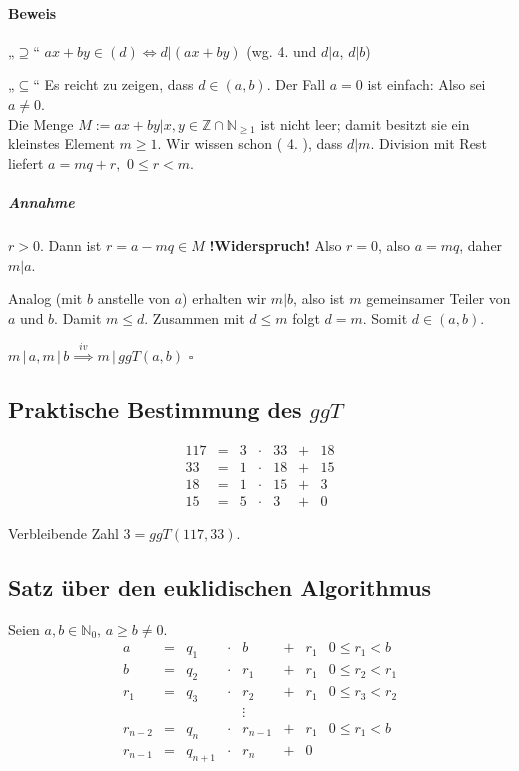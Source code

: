 \documentclass[14pt,a4paper]{article}
\newcommand{\N}{\ensuremath{\mathbb{N}}}
\newcommand{\Z}{\ensuremath{\mathbb{Z}}}
\newcommand{\Nzero}{\ensuremath{\N_0}}
\begin{document}
   		   \paragraph{Beweis}
   			   \par
   			   „$\supseteq$“
   			   $ ax + by \in (d) \Leftrightarrow d|(ax + by) $ (wg. 4. und $d|a$, $d|b$)
   			   \par
   			   „$\subseteq$“
   			   Es reicht zu zeigen, dass $ d \in (a,b) $.
   			   Der Fall $ a=0 $ ist einfach: Also sei $a \neq 0$. \\
   			   Die Menge $ M := {ax + by | x,y \in \Z} \cap \N_{\ge 1} $ ist nicht leer; damit besitzt sie ein kleinstes Element $m \ge 1$.
   			   Wir wissen schon ( 4. ), dass $d|m$.
   			   Division mit Rest liefert $ a = mq + r,\,\, 0 \le r < m $.

   			   \subparagraph{Annahme}
   				   $r > 0$. Dann ist $ r = a - mq \in M$ \textbf{!\;Widerspruch\;!} Also $ r = 0$, also $a = mq$, daher $m|a$.

   				   Analog (mit $b$ anstelle von $a$) erhalten wir $m | b$, also ist $m$ gemeinsamer Teiler von $a$ und $b$.
   				   Damit $m \le d$. Zusammen mit $ d \le m $ folgt $ d = m $.
   				   Somit $ d \in (a,b) $.

   				   $m\,|\,a, m\,|\,b \stackrel{iv}{\implies} m\,|\,ggT(a,b) $
   				   $\square$

   	   \subsection{Praktische Bestimmung des $ggT$}
   		   \[
   			   \begin{matrix}
   				   117 & = & 3 & \cdot & 33 & + & 18 \\
   					33 & = & 1 & \cdot & 18 & + & 15 \\
   					18 & = & 1 & \cdot & 15 & + &  3 \\
   					15 & = & 5 & \cdot &  3 & + &  0
   			   \end{matrix}
   		   \]

   		   Verbleibende Zahl $ 3 = ggT(117, 33) $.
   	   \subsection{Satz über den euklidischen Algorithmus}
   		   Seien $a,b \in \Nzero,\, a \ge b \ne 0 $.\\
   		   \[
   			   \begin{matrix}
   				   a       & = & q_1     & \cdot & b       & + & r_1 & 0 \le r_1 < b   \\
   				   b       & = & q_2     & \cdot & r_1     & + & r_1 & 0 \le r_2 < r_1 \\
   				   r_1     & = & q_3     & \cdot & r_2     & + & r_1 & 0 \le r_3 < r_2 \\
   						   &   &         &       & \vdots  &   &     &                 \\
   				   r_{n-2} & = & q_n     & \cdot & r_{n-1} & + & r_1 & 0 \le r_1 < b   \\
   				   r_{n-1} & = & q_{n+1} & \cdot & r_n     & + & 0   &
   			   \end{matrix}
   		   \]
\end{document}
